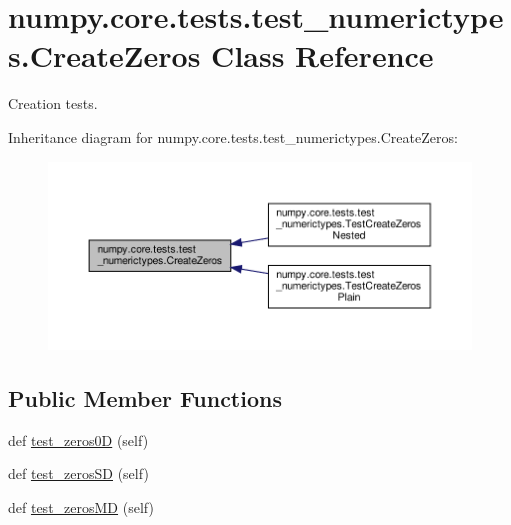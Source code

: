 \hypertarget{classnumpy_1_1core_1_1tests_1_1test__numerictypes_1_1CreateZeros}{}\section{numpy.\+core.\+tests.\+test\+\_\+numerictypes.\+Create\+Zeros Class Reference}
\label{classnumpy_1_1core_1_1tests_1_1test__numerictypes_1_1CreateZeros}


Creation tests.  




Inheritance diagram for numpy.\+core.\+tests.\+test\+\_\+numerictypes.\+Create\+Zeros\+:
\nopagebreak
\begin{figure}[H]
\begin{center}
\leavevmode
\includegraphics[width=350pt]{classnumpy_1_1core_1_1tests_1_1test__numerictypes_1_1CreateZeros__inherit__graph}
\end{center}
\end{figure}
\subsection*{Public Member Functions}
\begin{DoxyCompactItemize}
\item 
def \hyperlink{classnumpy_1_1core_1_1tests_1_1test__numerictypes_1_1CreateZeros_a9c3a4a663530aed66ca2fe8f5942ed48}{test\+\_\+zeros0D} (self)
\item 
def \hyperlink{classnumpy_1_1core_1_1tests_1_1test__numerictypes_1_1CreateZeros_a3af5d2900a14617b034a0374ca82a53d}{test\+\_\+zeros\+SD} (self)
\item 
def \hyperlink{classnumpy_1_1core_1_1tests_1_1test__numerictypes_1_1CreateZeros_a24272b451839b2bbf41ae4951b998d40}{test\+\_\+zeros\+MD} (self)
\end{DoxyCompactItemize}


